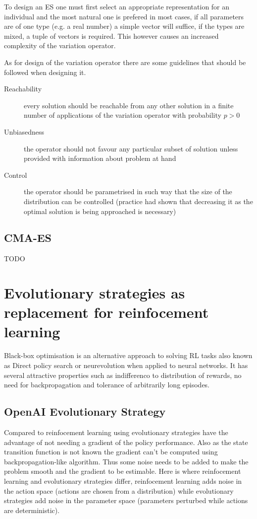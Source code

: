 To design an ES one must first select an appropriate representation for an individual and the most natural one is prefered in most cases, if all parameters are of one type (e.g. a real number) a simple vector will suffice, if the types are mixed, a tuple of vectors is required. This however causes an increased complexity of the variation operator.

As for design of the variation operator there are some guidelines that should be followed when designing it.
\begin{description}
    \item[Reachability] every solution should be reachable from any other solution in a finite number of applications of the variation operator with probability $p > 0$
    \item[Unbiasedness] the operator should not favour any particular subset of solution unless provided with information about problem at hand
    \item[Control] the operator should be parametrised in such way that the size of the distribution can be controlled (practice had shown that decreasing it as the optimal solution is being approached is necessary) 
\end{description}
\cite{Schwefel1995}
\cite{Rudolph2012}

\subsection{CMA-ES}
\label{subsec:cma-es}
TODO \cite{Hansen06}
\section{Evolutionary strategies as replacement for reinfocement learning}
\label{sec:es-reinf}

Black-box optimisation is an alternative approach to solving RL tasks also known as Direct policy search or neurevolution when applied to neural networks. It has several attractive properties such as indifferenco to distribution of rewards, no need for backpropagation and tolerance of arbitrarily long episodes.

\subsection{OpenAI Evolutionary Strategy}

Compared to reinfocement learning using evolutionary strategies have the advantage of not needing a gradient of the policy performance. Also as the state transition function is not known  the gradient can't be computed using backpropagation-like algorithm. Thus some noise needs to be added to make the problem smooth and the gradient to be estimable. Here is where reinfocement learning and evolutionary strategies differ, reinfocement learning adds noise in the action space (actions are chosen from a distribution) while evolutionary strategies add noise in the parameter space (parameters perturbed while actions are deterministic).



